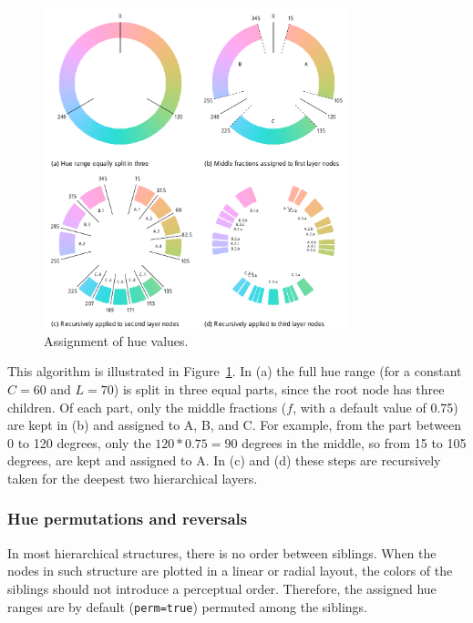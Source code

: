 \documentclass[journal]{vgtc}                %
\begin{document}
\begin{figure}[tb]
  \centering
  \includegraphics[width=3.5in]{hcl_method2.pdf}
  \caption{Assignment of hue values.}\label{fig:wheel}
\end{figure}

This algorithm is illustrated in Figure~\ref{fig:wheel}. In (a) the full hue range (for a constant $C=60$ and $L=70$)  is split in three equal parts, since the root node has three children. Of each part, only the middle fractions ($f$, with a default value of 0.75) are kept in (b) and assigned to A, B, and C. For example, from the part between 0 to 120 degrees, only the $120*0.75=90$ degrees in the middle, so from 15 to 105 degrees, are kept and assigned to A. In (c) and (d) these steps are recursively taken for the deepest two hierarchical layers.

\subsubsection{Hue permutations and reversals}\label{sechueperm}

In most hierarchical structures, there is no order between siblings. 
When the nodes in such structure are plotted in a linear or radial layout, 
the colors of the siblings should not introduce a perceptual order. Therefore, the assigned hue 
ranges are by default (\texttt{perm=true}) permuted among the siblings. 
\end{document}

